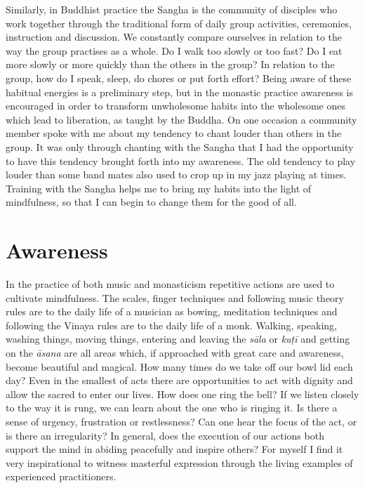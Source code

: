 Similarly, in Buddhist practice the Sangha is the community of disciples
who work together through the traditional form of daily group
activities, ceremonies, instruction and discussion. We constantly
compare ourselves in relation to the way the group practises as a whole. 
Do I walk too slowly or too fast? Do I eat more slowly or more quickly
than the others in the group? In relation to the group, how do I speak, 
sleep, do chores or put forth effort? Being aware of these habitual
energies is a preliminary step, but in the monastic practice awareness
is encouraged in order to transform unwholesome habits into the
wholesome ones which lead to liberation, as taught by the Buddha. On one
occasion a community member spoke with me about my tendency to chant
louder than others in the group. It was only through chanting with the
Sangha that I had the opportunity to have this tendency brought forth
into my awareness. The old tendency to play louder than some band mates
also used to crop up in my jazz playing at times. Training with the
Sangha helps me to bring my habits into the light of mindfulness, so
that I can begin to change them for the good of all. 

\section{Awareness}

In the practice of both music and monasticism repetitive actions are
used to cultivate mindfulness. The scales, finger techniques and
following music theory rules are to the daily life of a musician as
bowing, meditation techniques and following the Vinaya rules are to the
daily life of a monk. Walking, speaking, washing things, moving things, 
entering and leaving the \emph{sāla} or \emph{kuṭī} and getting on the
\emph{āsana} are all areas which, if approached with great care and
awareness, become beautiful and magical. How many times do we take off
our bowl lid each day? Even in the smallest of acts there are
opportunities to act with dignity and allow the sacred to enter our
lives. How does one ring the bell? If we listen closely to the way it is
rung, we can learn about the one who is ringing it. Is there a sense of
urgency, frustration or restlessness? Can one hear the focus of the act, 
or is there an irregularity? In general, does the execution of our
actions both support the mind in abiding peacefully and inspire others? 
For myself I find it very inspirational to witness masterful expression
through the living examples of experienced practitioners. 

